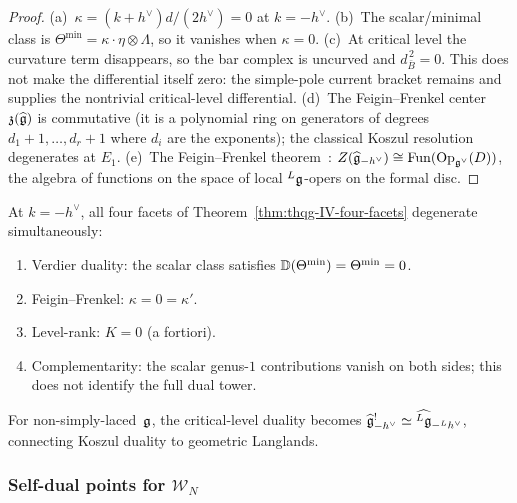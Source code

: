 \begin{proof}
(a)~$\kappa = (k + h^\vee)d/(2h^\vee) = 0$ at $k = -h^\vee$.
(b)~The scalar/minimal class is
$\Theta^{\min} = \kappa \cdot \eta \otimes \Lambda$, so it
vanishes when $\kappa = 0$.
(c)~At critical level the curvature term disappears, so the bar
complex is uncurved and $d_{\bar B}^{\,2} = 0$. This does not make
the differential itself zero: the simple-pole current bracket remains
and supplies the nontrivial critical-level differential.
(d)~The Feigin--Frenkel center $\mathfrak{z}(\widehat{\mathfrak{g}})$ is
commutative (it is a polynomial ring on generators of degrees
$d_1 + 1, \ldots, d_r + 1$ where $d_i$ are the exponents); the
classical Koszul resolution degenerates at $E_1$.
(e)~The Feigin--Frenkel theorem~\cite{Feigin-Frenkel}:
$Z(\widehat{\mathfrak{g}}_{-h^\vee}) \cong \mathrm{Fun}(\mathrm{Op}_{\mathfrak{g}^\vee}(D))$,
the algebra of functions on the space of local ${}^L\mathfrak{g}$-opers on the
formal disc.
\end{proof}

\begin{remark}
\label{rem:thqg-IV-critical-fixed}
At $k = -h^\vee$, all four facets of
Theorem~\ref{thm:thqg-IV-four-facets} degenerate simultaneously:
\begin{enumerate}[label=\textup{(\roman*)}]
\item Verdier duality: the scalar class satisfies
 $\mathbb{D}(\Theta^{\min}) = \Theta^{\min} = 0$.
\item Feigin--Frenkel: $\kappa = 0 = \kappa'$.
\item Level-rank: $K = 0$ (a fortiori).
\item Complementarity: the scalar genus-$1$ contributions vanish on
 both sides; this does not identify the full dual tower.
\end{enumerate}
For non-simply-laced~$\mathfrak{g}$, the critical-level duality becomes
$\widehat{\mathfrak{g}}_{-h^\vee}^! \simeq
\widehat{{}^L\mathfrak{g}}_{-{}^Lh^\vee}$, connecting Koszul duality to
geometric Langlands.
\end{remark}

\subsubsection{Self-dual points for \texorpdfstring{$\mathcal{W}_N$}{W(N)}}

